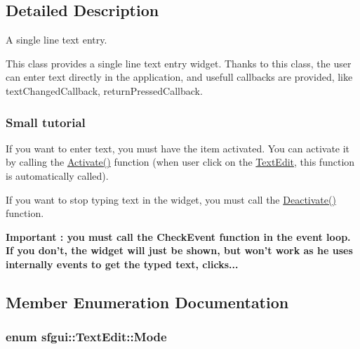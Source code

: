 \subsection{Detailed Description}
A single line text entry. 

This class provides a single line text entry widget. Thanks to this class, the user can enter text directly in the application, and usefull callbacks are provided, like textChangedCallback, returnPressedCallback.

\subsubsection*{Small tutorial}

If you want to enter text, you must have the item activated. You can activate it by calling the \hyperlink{classsfgui_1_1TextEdit_bcd256e053ae8f13a5c7f919f79c03c9}{Activate()} function (when user click on the \hyperlink{classsfgui_1_1TextEdit}{TextEdit}, this function is automatically called). \par
 If you want to stop typing text in the widget, you must call the \hyperlink{classsfgui_1_1TextEdit_49b0919fd6c43c35913f8a46a6788270}{Deactivate()} function. \par
 {\bf Important : you must call the CheckEvent function in the event loop. If you don't, the widget will just be shown, but won't work as he uses internally events to get the typed text, clicks...} 

\subsection{Member Enumeration Documentation}
\hypertarget{classsfgui_1_1TextEdit_f57eb4d7008c723b438197b3d0a12694}{
\subsubsection[Mode]{\setlength{\rightskip}{0pt plus 5cm}enum {\bf sfgui::TextEdit::Mode}}}
\label{classsfgui_1_1TextEdit_f57eb4d7008c723b438197b3d0a12694}


